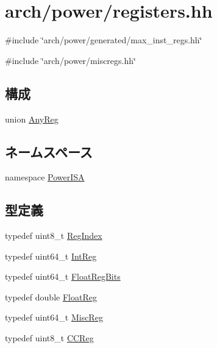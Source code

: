 \hypertarget{power_2registers_8hh}{
\section{arch/power/registers.hh}
\label{power_2registers_8hh}
}
{\ttfamily \#include \char`\"{}arch/power/generated/max\_\-inst\_\-regs.hh\char`\"{}}\par
{\ttfamily \#include \char`\"{}arch/power/miscregs.hh\char`\"{}}\par
\subsection*{構成}
\begin{DoxyCompactItemize}
\item 
union \hyperlink{unionPowerISA_1_1AnyReg}{AnyReg}
\end{DoxyCompactItemize}
\subsection*{ネームスペース}
\begin{DoxyCompactItemize}
\item 
namespace \hyperlink{namespacePowerISA}{PowerISA}
\end{DoxyCompactItemize}
\subsection*{型定義}
\begin{DoxyCompactItemize}
\item 
typedef uint8\_\-t \hyperlink{namespacePowerISA_a1c4e98d2e6a11a837bf9ccd20dd32f8a}{RegIndex}
\item 
typedef uint64\_\-t \hyperlink{namespacePowerISA_a0e080577527fb3e9685399f75b5caf15}{IntReg}
\item 
typedef uint64\_\-t \hyperlink{namespacePowerISA_a6905e424d12491fe126e1a22a9c8d655}{FloatRegBits}
\item 
typedef double \hyperlink{namespacePowerISA_a06fae4f187c7c94b8b0046dd6802be48}{FloatReg}
\item 
typedef uint64\_\-t \hyperlink{namespacePowerISA_aa16539aa6584fd12f7d6fa868f75b4de}{MiscReg}
\item 
typedef uint8\_\-t \hyperlink{namespacePowerISA_a5834599c0196ce4accda8049e7320621}{CCReg}
\end{DoxyCompactItemize}
